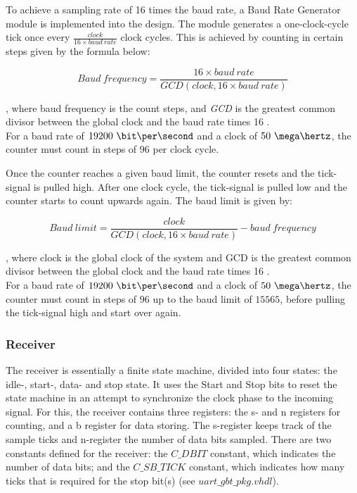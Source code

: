 \documentclass[main.tex]{subfiles}
\begin{document}
To achieve a sampling rate of 16 times the baud rate, a Baud Rate Generator module is implemented into the design. The module generates a one-clock-cycle tick once every $\frac{clock}{16 \times baud\ rate}$ clock cycles. This is achieved by counting in certain steps given by the formula below:

\begin{equation}
Baud\ frequency = \frac{16 \times baud\ rate}{GCD(clock, 16 \times baud\ rate)}
\end{equation}

, where baud frequency is the count steps, and \textit{GCD} is the greatest common divisor between the global clock and the baud rate times 16 \cite{velure10}. \\
For a baud rate of $19200\ \bit\per\second$ and a clock of $50\ \mega\hertz$, the counter must count in steps of $96$ per clock cycle. 

Once the counter reaches a given baud limit, the counter resets and the tick-signal is pulled high. After one clock cycle, the tick-signal is pulled low and the counter starts to count upwards again. The baud limit is given by:

\begin{equation}
Baud\ limit= \frac{clock}{GCD(clock, 16 \times baud\ rate)} - baud\ frequency
\end{equation}

, where clock is the global clock of the system and GCD is the greatest common divisor between the global clock and the baud rate times 16 \cite{velure10}. \\
For a baud rate of $19200\ \bit\per\second$ and a clock of $50\ \mega\hertz$, the counter must count in steps of $96$ up to the baud limit of $15565$, before pulling the tick-signal high and start over again. 

\subsubsection{Receiver}
The receiver is essentially a finite state machine, divided into four states: the idle-, start-, data- and stop state. It uses the Start and Stop bits to reset the state machine in an attempt to synchronize the clock phase to the incoming signal. For this, the receiver contains three registers: the s- and  n registers for counting, and a b register for data storing. The s-register keeps track of the sample ticks and n-register the number of data bits sampled.
There are two constants defined for the receiver: the $C\_DBIT$ constant, which indicates the number of data bits; and the $C\_SB\_TICK$ constant, which indicates how many ticks that is required for the stop bit(s) (see $uart\_gbt\_pkg.vhdl$). 
\end{document}
